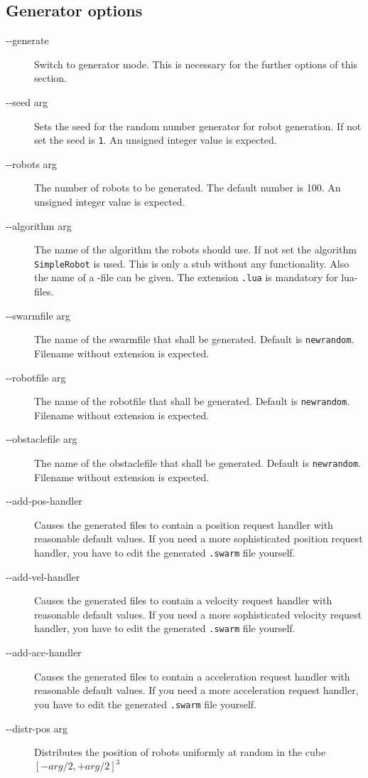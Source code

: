 \subsection{Generator options}
\begin{description}
	\item [-{}-generate] Switch to generator mode. This is necessary for the further options of this section.
	\item [-{}-seed arg] Sets the seed for the random number generator for robot generation. If not set the seed is {\tt 1}. An unsigned integer value is expected.
	\item [-{}-robots arg] The number of robots to be generated. The default number is 100. An unsigned integer value is expected.
	\item [-{}-algorithm arg] The name of the algorithm the robots should use. If not set the algorithm {\tt SimpleRobot} is used. This is only a stub without any functionality. Also the name of a \Lua-file can be given. The extension {\tt .lua} is mandatory for lua-files.
	\item [-{}-swarmfile arg] The name of the swarmfile that shall be generated. Default is {\tt newrandom}. Filename without extension is expected.
	\item [-{}-robotfile arg] The name of the robotfile that shall be generated. Default is {\tt newrandom}. Filename without extension is expected.
	\item [-{}-obstaclefile arg] The name of the obstaclefile that shall be generated. Default is {\tt newrandom}. Filename without extension is expected.
	\item [-{}-add-pos-handler] Causes the generated files to contain a position request handler with reasonable default values. If you need a more sophisticated position request handler, you have to edit the generated {\tt .swarm} file yourself.
	\item [-{}-add-vel-handler] Causes the generated files to contain a velocity request handler with reasonable default values. If you need a more sophisticated velocity request handler, you have to edit the generated {\tt .swarm} file yourself.
	\item [-{}-add-acc-handler] Causes the generated files to contain a acceleration request handler with reasonable default values. If you need a more acceleration request handler, you have to edit the generated {\tt .swarm} file yourself.
	\item [-{}-distr-pos arg] Distributes the position of robots uniformly at random in the cube $[-arg/2,+arg/2]^3$

\end{description}
